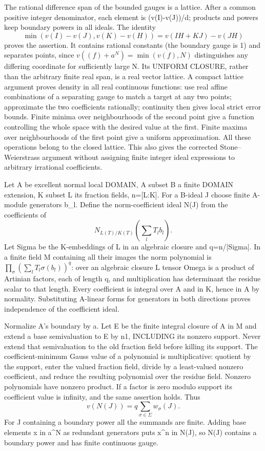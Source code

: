 \documentclass[11pt]{article}
\begin{document}
The rational difference span of the bounded gauges is a lattice. After a common positive integer denominator, each element is (v(I)-v(J))/d; products and powers keep boundary powers in all ideals. The identity
\[
 \min(v(I)-v(J),v(K)-v(H))=v(IH+KJ)-v(JH)
\]
proves the assertion. It contains rational constants (the boundary gauge is 1) and separates points, since \(v((f)+a^N)=\min(v(f),N)\) distinguishes any differing coordinate for sufficiently large N. Its UNIFORM CLOSURE, rather than the arbitrary finite real span, is a real vector lattice. A compact lattice argument proves density in all real continuous functions: use real affine combinations of a separating gauge to match a target at any two points; approximate the two coefficients rationally; continuity then gives local strict error bounds. Finite minima over neighbourhoods of the second point give a function controlling the whole space with the desired value at the first. Finite maxima over neighbourhoods of the first point give a uniform approximation. All these operations belong to the closed lattice. This also gives the corrected Stone--Weierstrass argument without assigning finite integer ideal expressions to arbitrary irrational coefficients.

Let A be excellent normal local DOMAIN, A subset B a finite DOMAIN extension, K subset L its fraction fields, n=[L:K]. For a B-ideal J choose finite A-module generators b\_l. Define the norm-coefficient ideal N(J) from the coefficients of
\[
 N_{L(T)/K(T)}\left(\sum_l T_l b_l\right).
\]
Let Sigma be the K-embeddings of L in an algebraic closure and q=n/|Sigma|. In a finite field M containing all their images the norm polynomial is \(\prod_{\sigma}(\sum_l T_l\sigma(b_l))^q\): over an algebraic closure L tensor Omega is a product of Artinian factors, each of length q, and multiplication has determinant the residue scalar to that length. Every coefficient is integral over A and in K, hence in A by normality. Substituting A-linear forms for generators in both directions proves independence of the coefficient ideal.

Normalize A's boundary by a. Let E be the finite integral closure of A in M and extend a base semivaluation to E by n1, INCLUDING its nonzero support. Never extend that semivaluation to the old fraction field before killing its support. The coefficient-minimum Gauss value of a polynomial is multiplicative: quotient by the support, enter the valued fraction field, divide by a least-valued nonzero coefficient, and reduce the resulting polynomial over the residue field. Nonzero polynomials have nonzero product. If a factor is zero modulo support its coefficient value is infinity, and the same assertion holds. Thus
\[
 v(N(J))=q\sum_{\sigma\in\Sigma}w_\sigma(J).
\]
For J containing a boundary power all the summands are finite. Adding base elements x in a\textasciicircum{}N as redundant generators puts x\textasciicircum{}n in N(J), so N(J) contains a boundary power and has finite continuous gauge.
\end{document}
